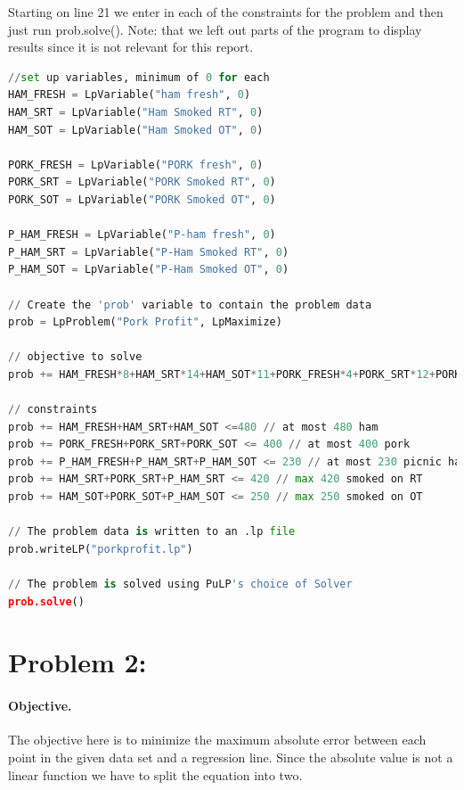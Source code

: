 \documentclass[11pt,letterpaper]{article}
\begin{document}
Starting on line 21 we enter in each of the constraints for the problem and then just run prob.solve(). Note: that we left out parts of the program to display results since it is not relevant for this report.  

\begin{lstlisting}[language=python,caption={Code to solve linear program},mathescape]
//set up variables, minimum of 0 for each
HAM_FRESH = LpVariable("ham fresh", 0)
HAM_SRT = LpVariable("Ham Smoked RT", 0)
HAM_SOT = LpVariable("Ham Smoked OT", 0)

PORK_FRESH = LpVariable("PORK fresh", 0)
PORK_SRT = LpVariable("PORK Smoked RT", 0)
PORK_SOT = LpVariable("PORK Smoked OT", 0)

P_HAM_FRESH = LpVariable("P-ham fresh", 0)
P_HAM_SRT = LpVariable("P-Ham Smoked RT", 0)
P_HAM_SOT = LpVariable("P-Ham Smoked OT", 0)

// Create the 'prob' variable to contain the problem data
prob = LpProblem("Pork Profit", LpMaximize)

// objective to solve
prob += HAM_FRESH*8+HAM_SRT*14+HAM_SOT*11+PORK_FRESH*4+PORK_SRT*12+PORK_SOT*7+P_HAM_FRESH*4+P_HAM_SRT*13+P_HAM_SOT*9

// constraints
prob += HAM_FRESH+HAM_SRT+HAM_SOT <=480 // at most 480 ham
prob += PORK_FRESH+PORK_SRT+PORK_SOT <= 400 // at most 400 pork
prob += P_HAM_FRESH+P_HAM_SRT+P_HAM_SOT <= 230 // at most 230 picnic ham
prob += HAM_SRT+PORK_SRT+P_HAM_SRT <= 420 // max 420 smoked on RT
prob += HAM_SOT+PORK_SOT+P_HAM_SOT <= 250 // max 250 smoked on OT

// The problem data is written to an .lp file
prob.writeLP("porkprofit.lp")

// The problem is solved using PuLP's choice of Solver
prob.solve()

\end{lstlisting}


\section*{Problem 2: }

\paragraph{Objective.} \bigskip The objective here is to minimize the maximum absolute error between each point in the given data set and a regression line. Since the absolute value is not a linear function we have to split the equation into two.  
\end{document}
